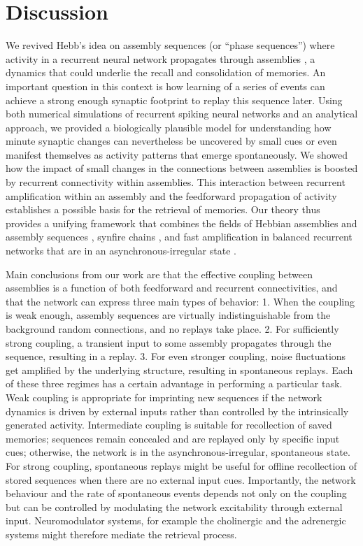 \section{Discussion} 
  We revived Hebb's idea on assembly sequences (or ``phase sequences'') where
  activity in a recurrent neural network propagates through assemblies
  \citep{Hebb49}, a dynamics that could underlie the recall and consolidation of
  memories. An important question in this context is how learning of a series
  of events can achieve a strong enough synaptic footprint to replay this
  sequence later.  Using both numerical simulations of recurrent spiking neural
  networks and an analytical approach, we provided a biologically plausible
  model for understanding how minute synaptic changes can nevertheless be
  uncovered by small cues or even manifest themselves as activity patterns that
  emerge spontaneously. We showed how the impact of small changes in the
  connections between assemblies is boosted by recurrent connectivity within
  assemblies.  This interaction between recurrent amplification within an
  assembly and the feedforward propagation of activity establishes a possible
  basis for the retrieval of memories. Our theory thus provides a unifying
  framework that combines the fields of Hebbian assemblies and assembly
  sequences \citep{Hebb49}, synfire chains \citep{Abeles1991, Diesmann1999}, and fast
  amplification in balanced recurrent networks that are in an
  asynchronous-irregular state \citep{Murphy2009, Vogels2011}.

  Main conclusions from our work are that the effective coupling between
  assemblies is a function of both feedforward and recurrent connectivities,
  and that the network can express three main types of behavior: 1. When the
  coupling is weak enough, assembly sequences are virtually indistinguishable
  from the background random connections, and no replays take place. 2. For
  sufficiently strong coupling, a transient input to some assembly propagates
  through the sequence, resulting in a replay. 3. For even stronger coupling,
  noise fluctuations get amplified by the underlying structure, resulting in
  spontaneous replays. Each of these three regimes has a certain advantage in
  performing a particular task. Weak coupling is appropriate for imprinting new
  sequences if the network dynamics is driven by external inputs rather than
  controlled by the intrinsically generated activity. Intermediate coupling is
  suitable for recollection of saved memories; sequences remain concealed and
  are replayed only by specific input cues; otherwise, the network is in the
  asynchronous-irregular, spontaneous state. For strong coupling, spontaneous
  replays might be useful for offline recollection of stored sequences when
  there are no external input cues. Importantly, the network behaviour and the
  rate of spontaneous events depends not only on the coupling but can be
  controlled by modulating the network excitability through external input.
  Neuromodulator systems, for example the cholinergic and the adrenergic
  systems \citep{Hasselmo1995, Thomas2015} might therefore mediate the retrieval
  process.

